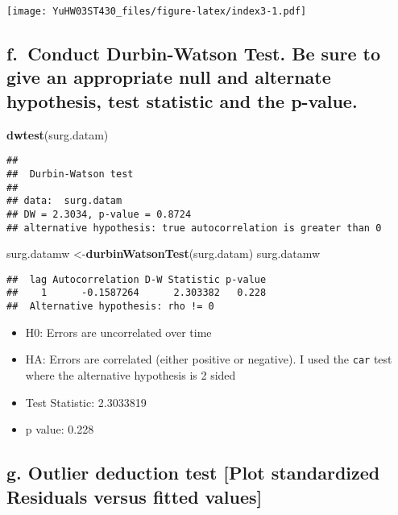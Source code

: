 \documentclass[
]{article}
\newenvironment{Shaded}{\begin{snugshade}}{\end{snugshade}}
\newcommand{\FunctionTok}[1]{\textcolor[rgb]{0.13,0.29,0.53}{\textbf{#1}}}
\newcommand{\NormalTok}[1]{#1}
\newcommand{\OtherTok}[1]{\textcolor[rgb]{0.56,0.35,0.01}{#1}}
\begin{document}
\texttt{[image: YuHW03ST430\_files/figure-latex/index3-1.pdf]}

\hypertarget{f.-conduct-durbin-watson-test.-be-sure-to-give-an-appropriate-null-and-alternate-hypothesis-test-statistic-and-the-p-value.}{%
\subsection{f.~Conduct Durbin-Watson Test. Be sure to give an
appropriate null and alternate hypothesis, test statistic and the
p-value.}\label{f.-conduct-durbin-watson-test.-be-sure-to-give-an-appropriate-null-and-alternate-hypothesis-test-statistic-and-the-p-value.}}

\begin{Shaded}
\begin{Highlighting}[]
\FunctionTok{dwtest}\NormalTok{(surg.datam)}
\end{Highlighting}
\end{Shaded}

\begin{verbatim}
## 
##  Durbin-Watson test
## 
## data:  surg.datam
## DW = 2.3034, p-value = 0.8724
## alternative hypothesis: true autocorrelation is greater than 0
\end{verbatim}

\begin{Shaded}
\begin{Highlighting}[]
\NormalTok{surg.datamw }\OtherTok{\textless{}{-}}\FunctionTok{durbinWatsonTest}\NormalTok{(surg.datam)}
\NormalTok{surg.datamw}
\end{Highlighting}
\end{Shaded}

\begin{verbatim}
##  lag Autocorrelation D-W Statistic p-value
##    1      -0.1587264      2.303382   0.228
##  Alternative hypothesis: rho != 0
\end{verbatim}

\begin{itemize}
\item
  H0: Errors are uncorrelated over time
\item
  HA: Errors are correlated (either positive or negative). I used the
  \texttt{car} test where the alternative hypothesis is 2 sided
\item
  Test Statistic: 2.3033819
\item
  p value: 0.228
\end{itemize}

\hypertarget{g.-outlier-deduction-test-plot-standardized-residuals-versus-fitted-values}{%
\subsection{g. Outlier deduction test {[}Plot standardized Residuals
versus fitted
values{]}}\label{g.-outlier-deduction-test-plot-standardized-residuals-versus-fitted-values}}
\end{document}

